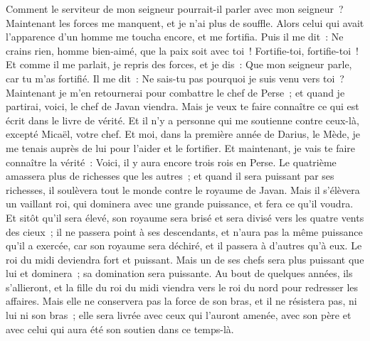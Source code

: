 \begin{multicols}{2}
Comment le serviteur de mon seigneur pourrait-il parler avec mon seigneur~? Maintenant les forces me manquent, et je n'ai plus de souffle.
Alors celui qui avait l'apparence d'un homme me toucha encore, et me fortifia.
Puis il me dit~: Ne crains rien, homme bien-aimé, que la paix soit avec toi~! Fortifie-toi, fortifie-toi~! Et comme il me parlait, je repris des forces, et je dis~: Que mon seigneur parle, car tu m'as fortifié.
Il me dit~: Ne sais-tu pas pourquoi je suis venu vers toi~? Maintenant je m'en retournerai pour combattre le chef de Perse~; et quand je partirai, voici, le chef de Javan viendra.
Mais je veux te faire connaître ce qui est écrit dans le livre de vérité. Et il n'y a personne qui me soutienne contre ceux-là, excepté Micaël, votre chef.
\VerseOne{}Et moi, dans la première année de Darius, le Mède, je me tenais auprès de lui pour l'aider et le fortifier.
Et maintenant, je vais te faire connaître la vérité~: Voici, il y aura encore trois rois en Perse. Le quatrième amassera plus de richesses que les autres~; et quand il sera puissant par ses richesses, il soulèvera tout le monde contre le royaume de Javan.
Mais il s'élèvera un vaillant roi, qui dominera avec une grande puissance, et fera ce qu'il voudra.
Et sitôt qu'il sera élevé, son royaume sera brisé et sera divisé vers les quatre vents des cieux~; il ne passera point à ses descendants, et n'aura pas la même puissance qu'il a exercée, car son royaume sera déchiré, et il passera à d'autres qu'à eux.
Le roi du midi deviendra fort et puissant. Mais un de ses chefs sera plus puissant que lui et dominera~; sa domination sera puissante.
Au bout de quelques années, ils s'allieront, et la fille du roi du midi viendra vers le roi du nord pour redresser les affaires. Mais elle ne conservera pas la force de son bras, et il ne résistera pas, ni lui ni son bras~; elle sera livrée avec ceux qui l'auront amenée, avec son père et avec celui qui aura été son soutien dans ce temps-là.

\end{multicols}
